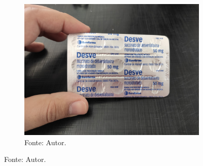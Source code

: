 \begin{figure}[htbp]
\begin{subfigure}[t]{0.45\textwidth}
        \includegraphics[width=\linewidth]{../pictures/IMG_20240725_110238.jpg}
        \caption*{Fonte: Autor.}
    \end{subfigure}
    \hfill
    \label{fig:fotos:quebint}
\end{figure}

